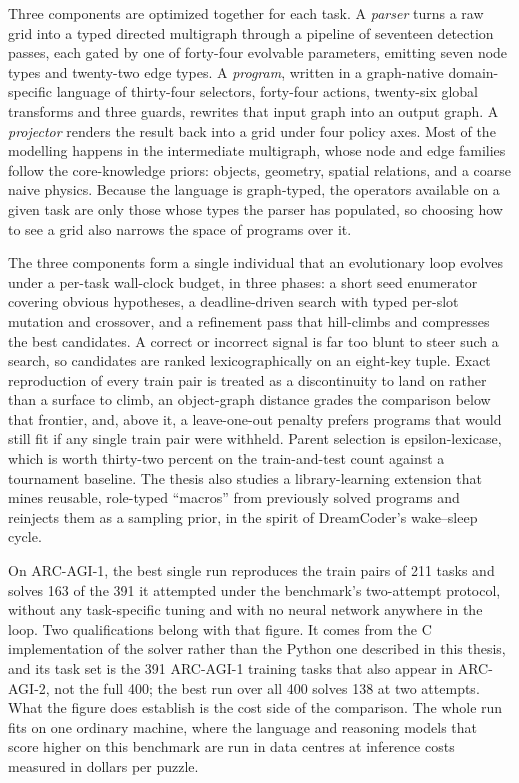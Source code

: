Three components are optimized together for each task. A \emph{parser} turns a raw grid
into a typed directed multigraph through a pipeline of seventeen detection passes, each
gated by one of forty-four evolvable parameters, emitting seven node types and twenty-two
edge types. A \emph{program}, written in a graph-native domain-specific language of
thirty-four selectors, forty-four actions, twenty-six global transforms and three guards,
rewrites that input graph into an output graph. A \emph{projector} renders the result back
into a grid under four policy axes. Most of the modelling happens in the intermediate
multigraph, whose node and edge families follow the core-knowledge priors: objects,
geometry, spatial relations, and a coarse naive physics. Because the language is
graph-typed, the operators available on a given task are only those whose types the parser
has populated, so choosing how to see a grid also narrows the space of programs over it.

The three components form a single individual that an evolutionary loop evolves under
a per-task wall-clock budget, in three phases: a short seed enumerator covering obvious
hypotheses, a deadline-driven search with typed per-slot mutation and crossover, and a
refinement pass that hill-climbs and compresses the best candidates. A correct or incorrect
signal is far too blunt to steer such a search, so candidates are ranked lexicographically
on an eight-key tuple. Exact reproduction of every train pair is treated as a
discontinuity to land on rather than a surface to climb, an object-graph distance grades the
comparison below that frontier, and, above it, a leave-one-out penalty prefers programs that
would still fit if any single train pair were withheld. Parent selection is
epsilon-lexicase, which is worth thirty-two percent on the train-and-test count against a
tournament baseline. The thesis also studies a library-learning extension that mines
reusable, role-typed ``macros'' from previously solved programs and reinjects them as a
sampling prior, in the spirit of DreamCoder's wake--sleep cycle.

On ARC-AGI-1, the best single run reproduces the train pairs of 211 tasks and solves
163 of the 391 it attempted under the benchmark's two-attempt protocol, without any
task-specific tuning and with no neural network anywhere in the loop. Two qualifications
belong with that figure. It comes from the C implementation of the solver rather than the
Python one described in this thesis, and its task set is the 391 ARC-AGI-1 training tasks that
also appear in ARC-AGI-2, not the full 400; the best run over all 400 solves 138 at two attempts. What the
figure does establish is the cost side of the comparison. The whole run fits on one ordinary
machine, where the language and reasoning models that score higher on this benchmark are run
in data centres at inference costs measured in dollars per puzzle.

